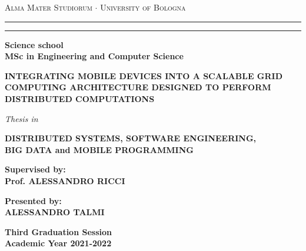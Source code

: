 \begin{titlepage}
    \begin{center}
    {{\Large{
        \textsc{Alma Mater Studiorum $\cdot$ University of Bologna}
    }}}
    \rule[0.1cm]{15.8cm}{0.1mm}
    \rule[0.5cm]{15.8cm}{0.6mm}
    {\small{\bf Science school\\ 
    MSc in Engineering and Computer Science }}
    \vspace{15mm}
    \end{center}
    \begin{center}
        \huge\bf INTEGRATING MOBILE DEVICES INTO A SCALABLE GRID COMPUTING ARCHITECTURE DESIGNED TO PERFORM DISTRIBUTED COMPUTATIONS
    \end{center}
    \vspace{15mm}
    \begin{center}
    {{\emph{Thesis in}}}
    
    \vspace{1mm}
    {{\bf{DISTRIBUTED SYSTEMS, SOFTWARE ENGINEERING,\\BIG DATA and MOBILE PROGRAMMING}}}
    \vspace{18mm}
    \end{center}
    \par
    \noindent
    \begin{minipage}[t]{0.47\textwidth}
    {\large{\bf Supervised by:\\
    Prof. ALESSANDRO RICCI}}
    \end{minipage}
    \hfill
    \begin{minipage}[t]{0.47\textwidth}\raggedleft
    {\large{\bf Presented by:\\
    ALESSANDRO TALMI}}
    \end{minipage}
    \vspace{20mm}
    \begin{center}
    {\large{\bf Third Graduation Session\\
    Academic Year 2021-2022}}
    \end{center}
\end{titlepage}
